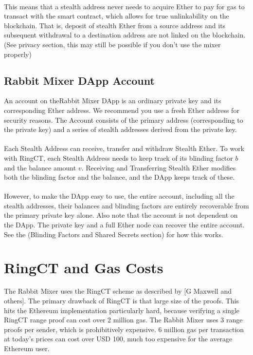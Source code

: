\documentclass{article}
\begin{document}
\paragraph{}
This means that a stealth address never needs to acquire Ether to pay for gas to transact with the smart contract, which allows for true unlinkability on the blockchain. That is, deposit of stealth Ether from a source address and its subsequent withdrawal to a destination address are not linked on the blockchain. (See privacy section, this may still be possible if you don't use the mixer properly)

\subsection{Rabbit Mixer DApp Account}
An account on theRabbit Mixer DApp is an ordinary private key and its corresponding Ether address. We recommend you use a fresh Ether address for security reasons. The Account consists of the primary address (corresponding to the private key) and a series of stealth addresses derived from the private key. 
\paragraph{}
Each Stealth Address can receive, transfer and withdraw Stealth Ether. To work with RingCT, each Stealth Address needs to keep track of its blinding factor $b$ and the balance amount $v$. Receiving and Transferring Stealth Ether modifies both the blinding factor and the balance, and the DApp keeps track of these. 
\paragraph{} 
However, to make the DApp easy to use, the entire account, including all the stealth addresses, their balances and blinding factors are entirely recoverable from the primary private key alone. Also note that the account is not dependent on the DApp. The private key and a full Ether node can recover the entire account.  See the (Blinding Factors and Shared Secrets section) for how this works. 

\section{RingCT and Gas Costs}
The Rabbit Mixer uses the RingCT scheme as described by [G Maxwell and others]. The primary drawback of RingCT is that large size of the proofs. This hits the Ethereum implementation particularly hard, because verifying a single RingCT range proof can cost over 2 million gas. The Rabbit Mixer uses 3 range proofs per sender, which is prohibitively expensive. 6 million gas per transaction at today's prices can cost over USD 100, much too expensive for the average Ethereum user. 
\end{document}
